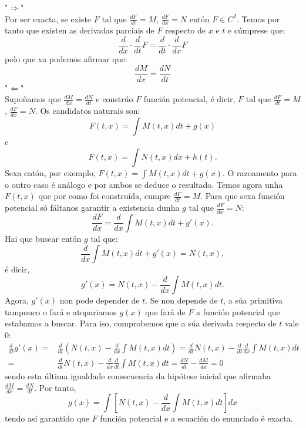 \documentclass[11pt, a4paper,twoside]{article}
\makeatletter
\theoremstyle{theorem-style}  %
\renewenvironment{proof}[1][\proofname]{\par
	\pushQED{\qed}%
	\normalfont \topsep6\p@\@plus6\p@\relax
	\list{}{%
		\settowidth{\leftmargin}{\quad:\hskip\labelsep}%
		\setlength{\labelwidth}{0pt}%
		\setlength{\itemindent}{-\leftmargin}%
	}%
	\item[\hskip\labelsep\itshape#1\@addpunct{:}]\ignorespaces
}{%
	\popQED\endlist\@endpefalse
}
\theoremstyle{definition-style}
\theoremstyle{example-style}
\makeatother
\begin{document}
\begin{proof}
	"$\Rightarrow$" \\
	Por ser exacta, se existe $F$ tal que $\frac{dF}{dt} = M$, $\frac{dF}{dx} = N$ entón $F \in C^2$. Temos por tanto que existen as derivadas parciais de $F$ respecto de $x$ e $t$ e cúmprese que:
	\[ \frac{d}{dx} \cdot \frac{d}{dt} F = \frac{d}{dt} \cdot \frac{d}{dx} F\]
	polo que xa podemos afirmar que:
	\[\frac{dM}{dx} = \frac{dN}{dt}\]
	"$\Leftarrow$" \\
	Supoñamos que $\frac{dM}{dx} = \frac{dN}{dt}$  e constrúo $F$ función potencial, é dicir, $F$ tal que $\frac{dF}{dt} = M$, $\frac{dF}{dx} = N$. Os candidatos naturais son:
	\[F(t,x)=\int M(t, x)dt + g(x)\]
	e
	\[F(t,x)=\int N(t, x)dx + h(t).\]
	Sexa entón, por exemplo, $F(t, x) = \int M(t, x)dt + g(x)$. O razoamento para o outro caso é análogo e por ambos se deduce o resultado. Temos agora unha $ F(t,x) $ que por como foi construída, cumpre $\frac{dF}{dt} = M$. Para que sexa función potencial só fáltanos garantir a existencia dunha $g$ tal que $\frac{dF}{dx} = N$:
	\[\frac{dF}{dx} = \frac{d}{dx}\int M(t, x)dt + g'(x).\]
	Hai que buscar entón $g$ tal que:
	\[\frac{d}{dx}\int M(t, x)dt + g'(x) = N(t, x),\]
	é dicir, 
	\[g'(x) = N(t, x) - \frac{d}{dx}\int M(t, x)dt.\]
	Agora, $ g'(x) $ non pode depender de $ t $. Se non depende de $ t $, a súa primitiva tampouco o fará e atopariamos $g(x)  $ que fará de $ F $ a función potencial que estabamos a buscar. Para iso, comprobemos que a súa derivada respecto de $ t $ vale 0:
	\begin{align*}
	\frac{d}{dt} g'(x)=	& \frac{d}{dt}\left( N(t, x) - \frac{d}{dx}\int M(t, x)dt\right)  =  \frac{d}{dt}N(t, x) -  \frac{d}{dt}\frac{d}{dx}\int M(t, x)dt  \\
		=& \frac{d}{dt}N(t, x) -  \frac{d}{dx}\frac{d}{dt}\int M(t, x)dt = 
		\frac{dN}{dt} - \frac{dM}{dx} = 0
	\end{align*}
	sendo esta última igualdade consecuencia da hipótese inicial que afirmaba $\frac{dM}{dx} = \frac{dN}{dt}$. Por tanto, 
	\[g(x) = \int\left[ N(t, x) - \frac{d}{dx}\int M(t, x)dt\right] dx\]
	tendo así garantido que $F$ función potencial e a ecuación do enunciado é exacta.
\end{proof}
\end{document}
